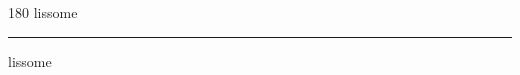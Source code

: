 
\begin{frame}
\begin{center}
\begin{turn}{180}
{\fontsize{2.5cm}{1em}\selectfont lissome}
\end{turn}
\vspace{1em}\par  
\hrule
\vspace{1em}\par  
{\fontsize{2.5cm}{1em}\selectfont lissome}
\end{center}
\end{frame}
